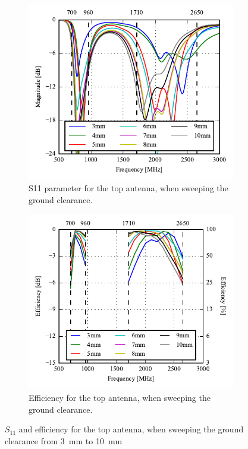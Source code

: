 \begin{figure}[htbp]
   \begin{subfigure}[b]{0.49\linewidth}
        \centering
        \includegraphics{img/tech_sol/monopole/5mm/s11_5mm}
        \caption{S11 parameter for the top antenna, when sweeping the ground clearance.}
        \label{fig:s11_mono_sim_5mm}
    \end{subfigure}
    \hfill
    \begin{subfigure}[b]{0.49\linewidth}
        \centering
        \includegraphics{img/tech_sol/monopole/5mm/eff_5mm}
        \caption{Efficiency for the top antenna, when sweeping the ground clearance.}
        \label{fig:eff_mono_sim_5mm}
    \end{subfigure}
    \caption{$S_{11}$ and efficiency for the top antenna, when sweeping the ground clearance from \SI{3}{mm} to \SI{10}{mm}}
    \label{fig:eff_s11_mono_sim_5mm}
\end{figure}

